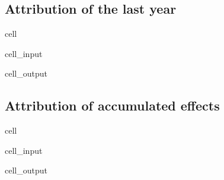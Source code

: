 \documentclass[letterpaper,10pt,english]{jupyterBook}
\begin{document}
\subsection{Attribution of the last year}
\label{\detokenize{content/06_ModelAnalytics/AttributionSomeFeatures:attribution-of-the-last-year}}
\begin{sphinxuseclass}{cell}\begin{sphinxVerbatimInput}

\begin{sphinxuseclass}{cell_input}
\begin{sphinxVerbatim}[commandchars=\\\{\}]
\end{sphinxVerbatim}

\end{sphinxuseclass}\end{sphinxVerbatimInput}
\begin{sphinxVerbatimOutput}

\begin{sphinxuseclass}{cell_output}
\noindent{}

\end{sphinxuseclass}\end{sphinxVerbatimOutput}

\end{sphinxuseclass}

\subsection{Attribution of accumulated effects}
\label{\detokenize{content/06_ModelAnalytics/AttributionSomeFeatures:attribution-of-accumulated-effects}}
\begin{sphinxuseclass}{cell}\begin{sphinxVerbatimInput}

\begin{sphinxuseclass}{cell_input}
\begin{sphinxVerbatim}[commandchars=\\\{\}]
\end{sphinxVerbatim}

\end{sphinxuseclass}\end{sphinxVerbatimInput}
\begin{sphinxVerbatimOutput}

\begin{sphinxuseclass}{cell_output}
\noindent{}

\end{sphinxuseclass}\end{sphinxVerbatimOutput}

\end{sphinxuseclass}
\end{document}
